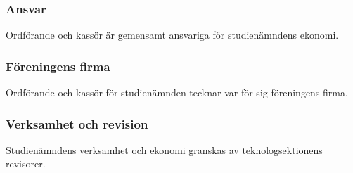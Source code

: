 \subsubsection{Ansvar}
Ordförande och kassör är gemensamt ansvariga för studienämndens ekonomi.
\subsubsection{Föreningens firma}
Ordförande och kassör för studienämnden tecknar var för sig föreningens firma.
\subsubsection{Verksamhet och revision}
Studienämndens verksamhet och ekonomi granskas av teknologsektionens revisorer.